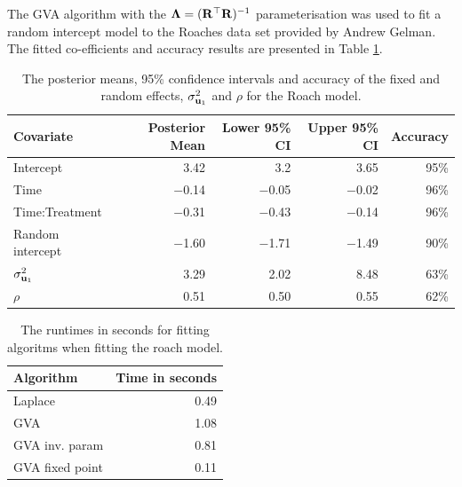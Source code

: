 			The GVA algorithm with the ${\boldsymbol \Lambda} = ({\bf R}^\top {\bf R})^{-1}$ parameterisation was used to fit a random
			intercept model to the Roaches data set provided by Andrew Gelman. The fitted co-efficients and accuracy
			results are presented in Table \ref{tab:application_roaches}.
					
					
					
			\begin{table}
				\begin{tabular}{|l|rrrr|}
					\hline
					Covariate          & Posterior Mean & Lower 95\% CI & Upper 95\% CI & Accuracy \\
					\hline
					Intercept          & 3.42						& 3.2 					& 3.65          & 95\%     \\
					Time               & $-$0.14        & $-$0.05       & $-$0.02       & 96\%     \\
					Time:Treatment     & $-$0.31        & $-$0.43       & $-$0.14       & 96\%     \\
					Random intercept   & $-$1.60        & $-$1.71       & $-$1.49       & 90\%     \\
					$\sigma^2_{{\bf u}_1}$ & 3.29           & 2.02          & 8.48          & 63\%     \\
					$\rho$             & 0.51           & 0.50          & 0.55          & 62\%     \\
					\hline
				\end{tabular}
				\caption{The posterior means, 95\% confidence intervals and accuracy of the fixed and random
									effects, $\sigma_{{\bf u}_1}^2$ and $\rho$ for the Roach model.}
				\label{tab:application_roaches}
			\end{table}

			\begin{table}
				\begin{tabular}{|lr|}
				\hline
				Algorithm & Time in seconds \\
				\hline
				Laplace & 0.49 \\
				GVA & 1.08 \\
				GVA inv. param & 0.81 \\
				GVA fixed point & 0.11 \\
				\hline
				\end{tabular}
				\label{tab:application_roaches_runtime}
				\caption{The runtimes in seconds for fitting algoritms when fitting the roach model.}
			\end{table}
					
